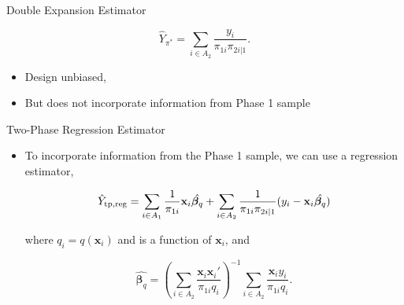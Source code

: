 \documentclass{beamer} %
\renewcommand{\bf}[1]{\mathbf{#1}}
\begin{document}
\begin{frame}{Double Expansion Estimator}
  \nocite{kott1997can}

  $$ \hat Y_{\pi^*} = \sum_{i \in A_2} \frac{y_i}{\pi_{1i} \pi_{2i|1}}.$$

  \begin{itemize}
    \item Design unbiased,
    \item But does not incorporate information from Phase 1 sample
  \end{itemize}

\end{frame}

\begin{frame}{Two-Phase Regression Estimator}

  \begin{itemize}
    \item To incorporate information from the Phase 1 sample, we can use a
      regression estimator,

    \begin{equation}
      \label{eq:tpreg}
      \hat Y_{\rm{tp, reg}} 
      = \sum_{i \in A_1} \frac{1}{\pi_{1i}} \bf x_i \hat{\bm \beta_q} + 
      \sum_{i \in A_2} \frac{1}{\pi_{1i}\pi_{2i|1}} (y_i - \bf x_i \hat{\bm \beta_q})
    \end{equation}

    where $q_i = q(\bf x_i)$ and is a function of $\bf x_i$, and 

    $$
    \hat{\bm \beta_q} = \left(\sum_{i \in A_2} 
      \frac{\bf x_i \bf x_i'}{\pi_{1i} q_i}\right)^{-1} 
      \sum_{i \in A_2} \frac{\bf x_i y_i}{\pi_{1i} q_i}.
    $$ 
  \end{itemize}

\end{frame}
\end{document}
